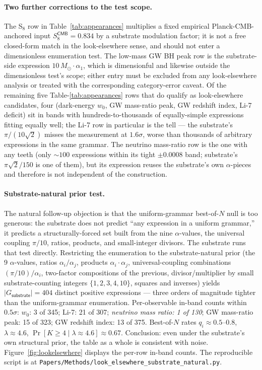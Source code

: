 \documentclass[11pt,a4paper]{amsart}
\theoremstyle{plain}
\theoremstyle{definition}
\begin{document}
\paragraph{Two further corrections to the test scope.} The S$_8$ row in Table~\ref{tab:appearances} multiplies a fixed empirical Planck-CMB-anchored input $S_8^{\textsf{CMB}} = 0.834$ by a substrate modulation factor; it is not a free closed-form match in the look-elsewhere sense, and should not enter a dimensionless enumeration test. The low-mass GW BH peak row is the substrate-side expression $10\,M_\odot \cdot \alpha_1$, which is dimensionful and likewise outside the dimensionless test's scope; either entry must be excluded from any look-elsewhere analysis or treated with the corresponding category-error caveat. Of the remaining five Table-\ref{tab:appearances} rows that do qualify as look-elsewhere candidates, four (dark-energy $w_0$, GW mass-ratio peak, GW redshift index, Li-7 deficit) sit in bands with hundreds-to-thousands of equally-simple expressions fitting equally well; the Li-7 row in particular is the tell --- the substrate's $\pi/(10\sqrt{2})$ misses the measurement at $1.6\sigma$, worse than thousands of arbitrary expressions in the same grammar. The neutrino mass-ratio row is the one with any teeth (only $\sim 100$ expressions within its tight $\pm 0.0008$ band; substrate's $\pi\sqrt{2}/150$ is one of them), but its expression reuses the substrate's own $\alpha$-pieces and therefore is not independent of the construction.

\paragraph{Substrate-natural prior test.} The natural follow-up objection is that the uniform-grammar best-of-$N$ null is too generous: the substrate does not predict ``any expression in a uniform grammar,'' it predicts a structurally-forced set built from the nine $\alpha$-values, the universal coupling $\pi/10$, ratios, products, and small-integer divisors. The substrate runs that test directly. Restricting the enumeration to the substrate-natural prior (the 9 $\alpha$-values, ratios $\alpha_i/\alpha_j$, products $\alpha_i \cdot \alpha_j$, universal-coupling combinations $(\pi/10)/\alpha_i$, two-factor compositions of the previous, divisor/multiplier by small substrate-counting integers $\{1, 2, 3, 4, 10\}$, squares and inverses) yields $|G_{\textsf{substrate}}| = 404$ distinct positive expressions --- three orders of magnitude tighter than the uniform-grammar enumeration. Per-observable in-band counts within $0.5\sigma$: $w_0$: 3 of 345; Li-7: 21 of 307; \emph{neutrino mass ratio: 1 of 130}; GW mass-ratio peak: 15 of 323; GW redshift index: 13 of 375. Best-of-$N$ rates $q_i \approx 0.5\text{--}0.8$, $\lambda \approx 4.6$, $\Pr[K \geq 4 \mid \lambda \approx 4.6] \approx 0.67$. Conclusion: even under the substrate's own structural prior, the table as a whole is consistent with noise. Figure~\ref{fig:lookelsewhere} displays the per-row in-band counts. The reproducible script is at \texttt{Papers/Methods/look\_elsewhere\_substrate\_natural.py}.
\end{document}
